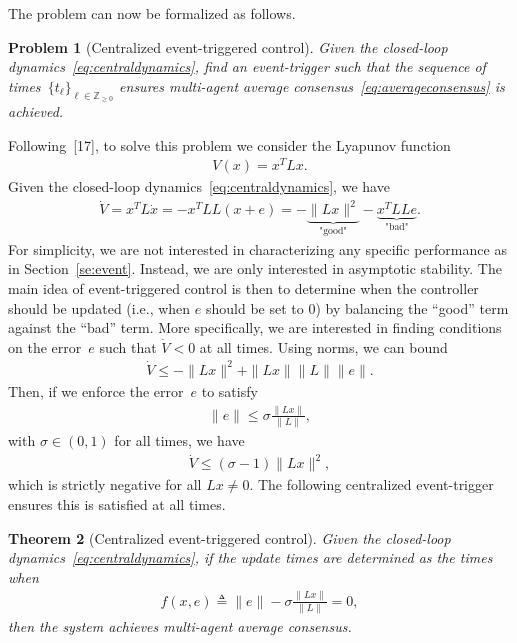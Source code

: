 \documentclass[]{book}
\newtheorem{theorem}{Theorem}[section]
\newtheorem{problem}[theorem]{Problem}
\newcommand{\integernonnegative}{\mathbb{Z}_{\ge 0}}
\newcommand{\TwoNorm}[1]{\|#1\|_2}
\renewcommand{\TwoNorm}[1]{\|#1\|}
\begin{document}
The problem can now be formalized as follows.

\begin{problem}[Centralized event-triggered control]
  Given the closed-loop dynamics~\eqref{eq:centraldynamics}, find an
  event-trigger such that the sequence of times~$\{ t_\ell \}_{\ell
    \in \integernonnegative}$ ensures multi-agent average
  consensus~\eqref{eq:averageconsensus} is achieved.
\end{problem}

Following~[17], to solve this problem we consider the
Lyapunov function
\begin{align*}
  V(x) = x^T L x.
\end{align*}
Given the closed-loop dynamics~\eqref{eq:centraldynamics}, we have
\begin{align*}
  \dot{V} = x^T L \dot{x} = -x^T L L (x + e) =
  -\underbrace{\TwoNorm{Lx}^2}_\text{"good"} - \underbrace{x^T L L
    e}_\text{"bad"} .
\end{align*}
For simplicity, we are not interested in characterizing any specific
performance as in Section~\ref{se:event}. Instead, we are only interested
in asymptotic stability. The main idea of event-triggered control is 
then to determine when the
controller should be updated (i.e., when $e$ should be set to 0) by
balancing the ``good'' term against the ``bad'' term. More specifically,
we are interested in finding conditions on the error~$e$ such that $\dot{V} <
0$ at all times. Using norms, we can bound
\begin{align*}
  \dot{V} \leq -\TwoNorm{Lx}^2 + \TwoNorm{Lx}\TwoNorm{L}\TwoNorm{e}.
\end{align*}
Then, if we enforce the error~$e$ to satisfy
\begin{align*}
  \TwoNorm{e} \leq \sigma \frac{ \TwoNorm{Lx} }{\TwoNorm{L}} ,
\end{align*}
with $\sigma \in (0,1)$ for all times, we have
\begin{align*}
  \dot{V} \leq (\sigma - 1) \TwoNorm{Lx}^2,
\end{align*}
which is strictly negative for all $Lx \neq 0$. The following
centralized event-trigger ensures this is satisfied at all times.

\begin{theorem}[Centralized event-triggered control]
  Given the closed-loop dynamics~\eqref{eq:centraldynamics}, if the
  update times are determined as the times when
  \begin{align}\label{eq:centraltrigger}
    f(x,e) \triangleq \TwoNorm{e} - \sigma \frac{
      \TwoNorm{Lx}}{\TwoNorm{L}} = 0,
  \end{align}
  then the system achieves multi-agent average consensus.
\end{theorem}
\end{document}
